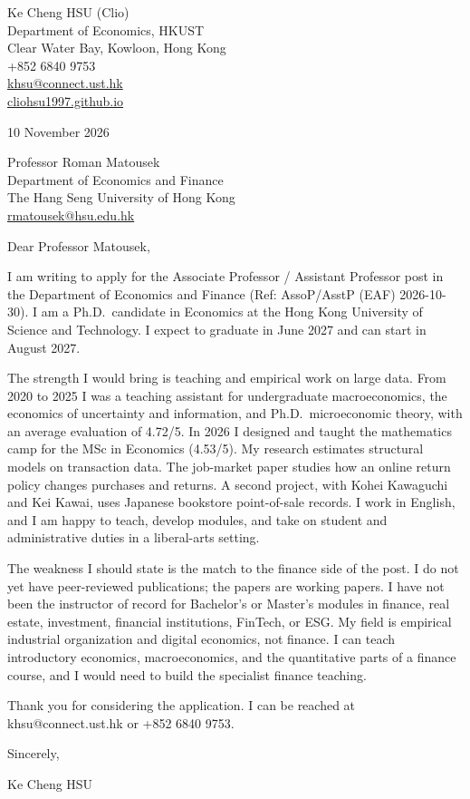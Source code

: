 \documentclass[11pt]{article}
\begin{document}
\begin{flushright}
Ke Cheng HSU (Clio)\\
Department of Economics, HKUST\\
Clear Water Bay, Kowloon, Hong Kong\\
+852 6840 9753\\
\href{mailto:khsu@connect.ust.hk}{khsu@connect.ust.hk}\\
\href{https://cliohsu1997.github.io}{cliohsu1997.github.io}
\end{flushright}

10 November 2026

Professor Roman Matousek\\
Department of Economics and Finance\\
The Hang Seng University of Hong Kong\\
\href{mailto:rmatousek@hsu.edu.hk}{rmatousek@hsu.edu.hk}

Dear Professor Matousek,

I am writing to apply for the Associate Professor / Assistant Professor post in the Department of Economics and Finance (Ref: AssoP/AsstP (EAF) 2026-10-30). I am a Ph.D.\ candidate in Economics at the Hong Kong University of Science and Technology. I expect to graduate in June 2027 and can start in August 2027.

The strength I would bring is teaching and empirical work on large data. From 2020 to 2025 I was a teaching assistant for undergraduate macroeconomics, the economics of uncertainty and information, and Ph.D.\ microeconomic theory, with an average evaluation of 4.72/5. In 2026 I designed and taught the mathematics camp for the MSc in Economics (4.53/5). My research estimates structural models on transaction data. The job-market paper studies how an online return policy changes purchases and returns. A second project, with Kohei Kawaguchi and Kei Kawai, uses Japanese bookstore point-of-sale records. I work in English, and I am happy to teach, develop modules, and take on student and administrative duties in a liberal-arts setting.

The weakness I should state is the match to the finance side of the post. I do not yet have peer-reviewed publications; the papers are working papers. I have not been the instructor of record for Bachelor's or Master's modules in finance, real estate, investment, financial institutions, FinTech, or ESG. My field is empirical industrial organization and digital economics, not finance. I can teach introductory economics, macroeconomics, and the quantitative parts of a finance course, and I would need to build the specialist finance teaching.

Thank you for considering the application. I can be reached at khsu@connect.ust.hk or +852 6840 9753.

Sincerely,

Ke Cheng HSU
\end{document}
